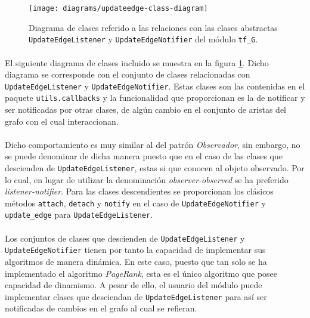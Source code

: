 \documentclass{subfiles}
\begin{document}
          \begin{figure}[h!]
            \centering
            \texttt{[image: diagrams/updateedge-class-diagram]}
            \caption{Diagrama de clases referido a las relaciones con las clases abstractas \texttt{UpdateEdgeListener} y \texttt{UpdateEdgeNotifier} del módulo \texttt{tf\_G}.}
            \label{img:update_edge_diagram}
          \end{figure}

          \paragraph{}
          El siguiente diagrama de clases incluido se muestra en la figura \ref{img:update_edge_diagram}. Dicho diagrama se corresponde con el conjunto de clases relacionadas con \texttt{UpdateEdgeListener} y \texttt{UpdateEdgeNotifier}. Estas clases son las contenidas en el paquete \texttt{utils.callbacks} y la funcionalidad que proporcionan es la de notificar y ser notificadas por otras clases, de algún cambio en el conjunto de aristas del grafo con el cual interaccionan.

          \paragraph{}
          Dicho comportamiento es muy similar al del patrón \emph{Observador}, sin embargo, no se puede denominar de dicha manera puesto que en el caso de las clases que descienden de \texttt{UpdateEdgeListener}, estas si que conocen al objeto observado. Por lo cual, en lugar de utilizar la denominación \emph{observer-observed} se ha preferido \emph{listener-notifier}. Para las clases descendientes se proporcionan los clásicos métodos \texttt{attach}, \texttt{detach} y \texttt{notify} en el caso de \texttt{UpdateEdgeNotifier} y \texttt{update\_edge} para \texttt{UpdateEdgeListener}.

          \paragraph{}
          Los conjuntos de clases que descienden de \texttt{UpdateEdgeListener} y \texttt{UpdateEdgeNotifier} tienen por tanto la capacidad de implementar sus algoritmos de manera dinámica. En este caso, puesto que tan solo se ha implementado el algoritmo \emph{PageRank}, esta es el único algoritmo que posee capacidad de dinamismo. A pesar de ello, el usuario del módulo puede implementar clases que desciendan de \texttt{UpdateEdgeListener} para así ser notificadas de cambios en el grafo al cual se refieran.
\end{document}
